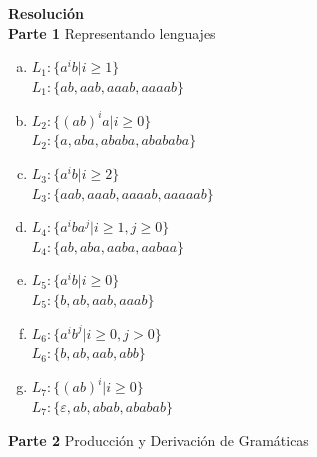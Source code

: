 \documentclass{article}
\begin{document}
    \textbf{Resolución}\\
    
    \textbf{Parte 1} Representando lenguajes \cite{sipser13}
    
    \begin{enumerate} [(a)]
        \item   $ L_1 : \{a^ib | i \geq 1\}$ \\
                $ L_1 : \{ab, aab, aaab, aaaab\}$   
        \item   $ L_2 : \{(ab)^ia | i \geq 0\}$ \\
                $ L_2 : \{a, aba, ababa, abababa\}$   
        \item   $ L_3 : \{a^ib | i \geq 2\}$ \\
                $ L_3 : \{aab, aaab, aaaab, aaaaab\}$
        \item   $ L_4 : \{a^iba^j| i \geq 1, j \geq 0\}$ \\
                $ L_4 : \{ab, aba, aaba, aabaa\}$
        \item   $ L_5 : \{a^ib | i \geq 0\}$ \\
                $ L_5 : \{b, ab, aab, aaab\}$
        \item   $ L_6 : \{a^ib^j| i \geq 0, j > 0\}$ \\
                $ L_6 : \{b, ab, aab, abb\}$
        \item   $ L_7 : \{(ab)^i| i \geq 0\}$ \\
                $ L_7 : \{\varepsilon, ab, abab, ababab\}$
    \end{enumerate}
    
    \textbf{Parte 2} Producción y Derivación de Gramáticas \cite{Hopcroft+Ullman/79/Introduction}
    
\end{document}
